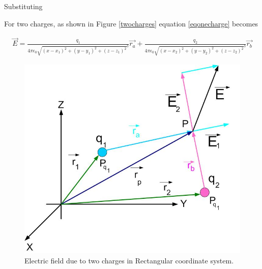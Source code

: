 \documentclass{ximera}
\begin{document}
Substituting 


For two charges, as shown in Figure \ref{twocharges} equation \ref{eqonecharge} becomes

\begin{eqnarray}
\vec{E}= \frac{q_1}{4 \pi \epsilon_{0} {\sqrt{(x - x_1)^2 +(y - y_1)^2 +(z - z_1)^2}
}^3} \vec{r_a} + \frac{q_2}{4 \pi \epsilon_{0} {\sqrt{(x - x_2)^2 +(y - y_2)^2 +(z - z_2)^2}
}^3} \vec{r_b} 
\end{eqnarray}


\begin{figure}[htbp]
\begin{center}
\includegraphics[scale=0.5]{../jpg/twochargescartcoord.jpg}
\end{center}
\caption{Electric field due to two charges in  Rectangular coordinate system.}
\label{singlecharge}
\end{figure}
\end{document}
